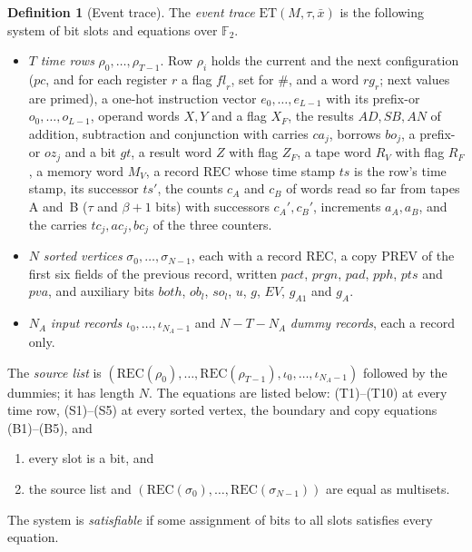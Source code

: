 \documentclass[11pt,letterpaper]{article}
\theoremstyle{definition}
\newtheorem{definition}[theorem]{Definition}
\theoremstyle{remark}
\begin{document}
\begin{definition}[Event trace]
The \emph{event trace} \(\mathrm{ET}(M,\tau,\bar x)\) is the following
system of bit slots and equations over \(\mathbb F_2\).
\begin{itemize}
\item \(T\) \emph{time rows} \(\rho_0,\ldots,\rho_{T-1}\). Row \(\rho_i\)
holds the current and the next configuration (\(\mathit{pc}\), and for
each register \(r\) a flag \(\mathit{fl}_r\), set for \(\#\), and a word
\(\mathit{rg}_r\); next values are primed), a one-hot instruction vector
\(e_0,\ldots,e_{L-1}\) with its prefix-or \(o_0,\ldots,o_{L-1}\), operand
words \(X,Y\) and a flag \(X_F\), the results \(\mathit{AD},\mathit{SB},
\mathit{AN}\) of addition, subtraction and conjunction with carries
\(\mathit{ca}_j\), borrows \(\mathit{bo}_j\), a prefix-or
\(\mathit{oz}_j\) and a bit \(\mathit{gt}\), a result word \(Z\) with flag
\(Z_F\), a tape word \(R_V\) with flag \(R_F\), a memory word \(M_V\),
a record \(\mathrm{REC}\) whose time stamp \(\mathit{ts}\) is the row's
time stamp, its successor \(\mathit{ts}'\), the counts \(c_A\) and
\(c_B\) of words read so far from tapes A and~B (\(\tau\) and
\(\beta+1\) bits) with successors \(c_A',c_B'\), increments \(a_A,a_B\),
and the carries \(\mathit{tc}_j,\mathit{ac}_j,\mathit{bc}_j\) of the
three counters.
\item \(N\) \emph{sorted vertices} \(\sigma_0,\ldots,\sigma_{N-1}\), each
with a record \(\mathrm{REC}\), a copy \(\mathrm{PREV}\) of the first
six fields of the previous record, written \(\mathit{pact}\),
\(\mathit{prgn}\), \(\mathit{pad}\), \(\mathit{pph}\), \(\mathit{pts}\)
and \(\mathit{pva}\), and auxiliary bits \(\mathit{both}\),
\(\mathit{ob}_l\), \(\mathit{so}_l\), \(u\), \(g\), \(\mathit{EV}\),
\(g_{A1}\) and \(g_A\).
\item \(N_A\) \emph{input records} \(\iota_0,\ldots,\iota_{N_A-1}\) and
\(N-T-N_A\) \emph{dummy records}, each a record only.
\end{itemize}
The \emph{source list} is \((\mathrm{REC}(\rho_0),\ldots,
\mathrm{REC}(\rho_{T-1}),\iota_0,\ldots,\iota_{N_A-1})\) followed by the
dummies; it has length \(N\). The equations are listed below:
(T1)--(T10) at every time row, (S1)--(S5) at every sorted vertex, the
boundary and copy equations (B1)--(B5), and
\begin{enumerate}[label=(\Alph*),start=7]
\item every slot is a bit, and
\setcounter{enumi}{15}
\item the source list and \((\mathrm{REC}(\sigma_0),\ldots,
\mathrm{REC}(\sigma_{N-1}))\) are equal as multisets.
\end{enumerate}
The system is \emph{satisfiable} if some assignment of bits to all
slots satisfies every equation.
\end{definition}
\end{document}

